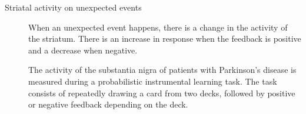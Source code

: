 \begin{description}
    \item[Striatal activity on unexpected events] 
        When an unexpected event happens, there is a change in the activity of the striatum.
        There is an increase in response when the feedback is positive and a decrease when negative.

        \begin{@empty}
            \small
            \begin{example}
                The activity of the substantia nigra of patients with Parkinson's disease is measured during a probabilistic instrumental learning task.
                The task consists of repeatedly drawing a card from two decks, followed by positive or negative feedback depending on the deck.


\end{example}
\end{@empty}
\end{description}
